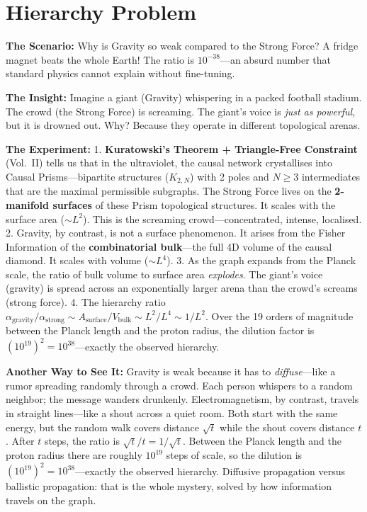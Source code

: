 \documentclass[11pt, a4paper, openany]{book}
\begin{document}
\section{Hierarchy Problem}
\begin{thoughtexp}
\textbf{The Scenario:} Why is Gravity so weak compared to the Strong Force? A fridge magnet beats the whole Earth! The ratio is $10^{-38}$---an absurd number that standard physics cannot explain without fine-tuning.

\textbf{The Insight:} Imagine a giant (Gravity) whispering in a packed football stadium. The crowd (the Strong Force) is screaming. The giant's voice is \emph{just as powerful}, but it is drowned out. Why? Because they operate in different topological arenas.

\textbf{The Experiment:}
1. \textbf{Kuratowski's Theorem + Triangle-Free Constraint} (Vol.~II) tells us that in the ultraviolet, the causal network crystallises into Causal Prisms---bipartite structures ($K_{2,N}$) with 2 poles and $N \ge 3$ intermediates that are the maximal permissible subgraphs. The Strong Force lives on the \textbf{2-manifold surfaces} of these Prism topological structures. It scales with the surface area ($\sim L^2$). This is the screaming crowd---concentrated, intense, localised.
2. Gravity, by contrast, is not a surface phenomenon. It arises from the Fisher Information of the \textbf{combinatorial bulk}---the full 4D volume of the causal diamond. It scales with volume ($\sim L^4$).
3. As the graph expands from the Planck scale, the ratio of bulk volume to surface area \emph{explodes}. The giant's voice (gravity) is spread across an exponentially larger arena than the crowd's screams (strong force).
4. The hierarchy ratio $\alpha_{\text{gravity}}/\alpha_{\text{strong}} \sim A_{\text{surface}}/V_{\text{bulk}} \sim L^2/L^4 \sim 1/L^2$. Over the 19 orders of magnitude between the Planck length and the proton radius, the dilution factor is $(10^{19})^2 = 10^{38}$---exactly the observed hierarchy.

\textbf{Another Way to See It:} Gravity is weak because it has to \emph{diffuse}---like a rumor spreading randomly through a crowd. Each person whispers to a random neighbor; the message wanders drunkenly. Electromagnetism, by contrast, travels in straight lines---like a shout across a quiet room. Both start with the same energy, but the random walk covers distance $\sqrt{t}$ while the shout covers distance $t$. After $t$ steps, the ratio is $\sqrt{t}/t = 1/\sqrt{t}$. Between the Planck length and the proton radius there are roughly $10^{19}$ steps of scale, so the dilution is $(10^{19})^2 = 10^{38}$---exactly the observed hierarchy. Diffusive propagation versus ballistic propagation: that is the whole mystery, solved by how information travels on the graph.


\end{thoughtexp}
\end{document}
